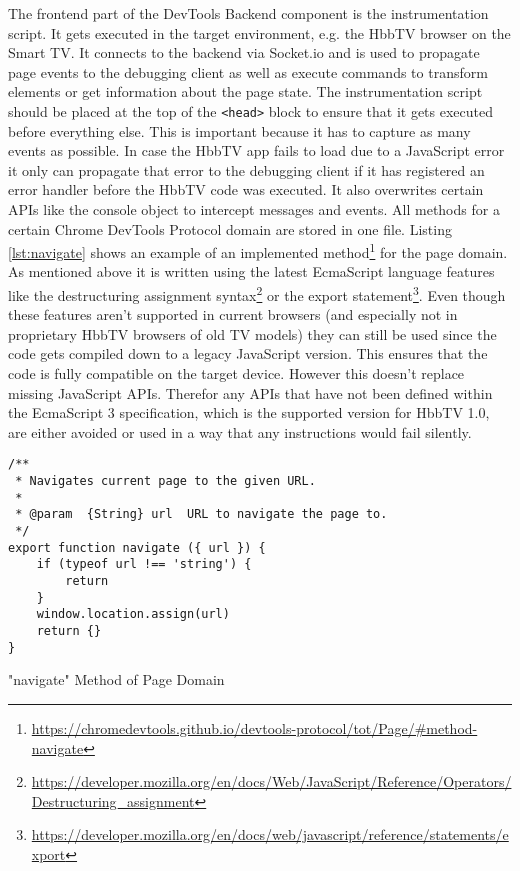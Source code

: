 The frontend part of the DevTools Backend component is the instrumentation script. It gets executed
in the target environment, e.g. the HbbTV browser on the Smart TV. It connects to the backend via
Socket.io and is used to propagate page events to the debugging client as well as execute commands
to transform elements or get information about the page state. The instrumentation script should be
placed at the top of the \texttt{<head>} block to ensure that it gets executed before everything
else. This is important because it has to capture as many events as possible. In case the HbbTV app
fails to load due to a JavaScript error it only can propagate that error to the debugging client if
it has registered an error handler before the HbbTV code was executed. It also overwrites certain APIs
like the console object to intercept messages and events. All methods for a certain Chrome DevTools
Protocol domain are stored in one file. Listing \ref{lst:navigate} shows an example of an implemented
method\footnote{\url{https://chromedevtools.github.io/devtools-protocol/tot/Page/\#method-navigate}}
for the page domain. As mentioned above it is written using the latest EcmaScript language features
like the destructuring assignment syntax\footnote{\url{https://developer.mozilla.org/en/docs/Web/JavaScript/Reference/Operators/Destructuring_assignment}}
or the export statement\footnote{\url{https://developer.mozilla.org/en/docs/web/javascript/reference/statements/export}}.
Even though these features aren't supported in current browsers (and especially not in proprietary
HbbTV browsers of old TV models) they can still be used since the code gets compiled down to a legacy
JavaScript version. This ensures that the code is fully compatible on the target device. However this
doesn't replace missing JavaScript APIs. Therefor any APIs that have not been defined within the
EcmaScript 3 specification, which is the supported version for HbbTV 1.0, are either avoided or used
in a way that any instructions would fail silently.

\begin{listing}[H]
\begin{verbatim}
/**
 * Navigates current page to the given URL.
 *
 * @param  {String} url  URL to navigate the page to.
 */
export function navigate ({ url }) {
    if (typeof url !== 'string') {
        return
    }
    window.location.assign(url)
    return {}
}
\end{verbatim}
\caption{"navigate" Method of Page Domain}
\label{lst:navigate}
\end{listing}

